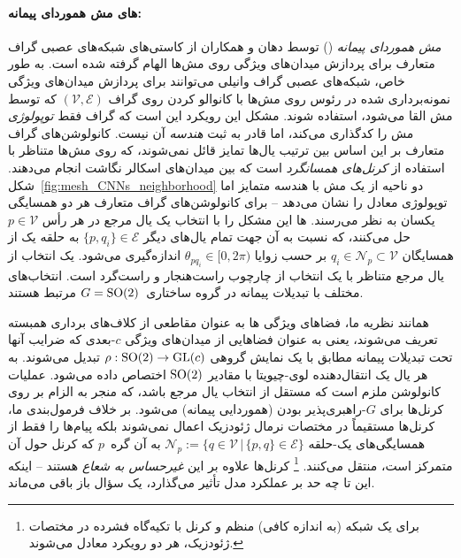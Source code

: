 \paragraph{های مش هموردای پیمانه:}
\emph{ مش هموردای پیمانه} () توسط دهان و همکاران\cite{deHaan2020meshCNNs} از کاستی‌های شبکه‌های عصبی گراف متعارف برای پردازش میدان‌های ویژگی روی مش‌ها الهام گرفته شده است.
به طور خاص، شبکه‌های عصبی گراف وانیلی می‌توانند برای پردازش میدان‌های ویژگی نمونه‌برداری شده در رئوس روی مش‌ها با کانوالو کردن روی گراف $(\mathcal{V},\mathcal{E})$ که توسط مش القا می‌شود، استفاده شوند.
مشکل این رویکرد این است که گراف فقط \emph{توپولوژی} مش را کدگذاری می‌کند، اما قادر به ثبت \emph{هندسه} آن نیست.
کانولوشن‌های گراف متعارف بر این اساس بین ترتیب یال‌ها تمایز قائل نمی‌شوند، که روی مش‌ها متناظر با استفاده از \emph{کرنل‌های همسانگرد} است که بین میدان‌های اسکالر نگاشت انجام می‌دهند.
شکل~\ref{fig:mesh_CNNs_neighborhood} دو ناحیه از یک مش با هندسه متمایز اما توپولوژی معادل را نشان می‌دهد -- برای کانولوشن‌های گراف متعارف هر دو همسایگی یکسان به نظر می‌رسند.
ها این مشکل را با انتخاب یک یال مرجع در هر رأس $p\in\mathcal{V}$ حل می‌کنند، که نسبت به آن جهت تمام یال‌های دیگر $\{p,q_i\} \in\mathcal{E}$ به حلقه یک از همسایگان $q_i\in \mathcal{N}_p \subset\mathcal{V}$ بر حسب زوایا $\theta_{pq_i} \in [0,2\pi)$ اندازه‌گیری می‌شود.
یک انتخاب از یال مرجع متناظر با یک انتخاب از چارچوب راست‌هنجار و راست‌گرد است.
انتخاب‌های مختلف با تبدیلات پیمانه در گروه ساختاری~$G=\operatorname{SO}(2)$ مرتبط هستند.

همانند نظریه ما، فضاهای ویژگی ها به عنوان مقاطعی از کلاف‌های برداری همبسته تعریف می‌شوند، یعنی به عنوان فضاهایی از میدان‌های ویژگی $c$-بعدی که ضرایب آنها تحت تبدیلات پیمانه مطابق با یک نمایش گروهی $\rho: \operatorname{SO}(2) \to \operatorname{GL}(c)$ تبدیل می‌شوند.
به هر یال یک انتقال‌دهنده لوی-چیویتا با مقادیر $\operatorname{SO}(2)$ اختصاص داده می‌شود.
عملیات کانولوشن ملزم است که مستقل از انتخاب یال مرجع باشد، که منجر به الزام بر روی کرنل‌ها برای $G$-راهبری‌پذیر بودن (هموردایی پیمانه) می‌شود.
بر خلاف فرمول‌بندی ما، کرنل‌ها مستقیماً در مختصات نرمال ژئودزیک اعمال نمی‌شوند بلکه پیام‌ها را فقط از همسایگی‌های یک-حلقه $\mathcal{N}_p := \{q\in\mathcal{V} \,|\, \{p,q\}\in\mathcal{E} \}$ به آن گره~$p$ که کرنل حول آن متمرکز است، منتقل می‌کنند.%
\footnote{
    برای یک شبکه (به اندازه کافی) منظم و کرنل با تکیه‌گاه فشرده در مختصات ژئودزیک، هر دو رویکرد معادل می‌شوند.
}
کرنل‌ها علاوه بر این \emph{غیرحساس به شعاع} هستند -- اینکه این تا چه حد بر عملکرد مدل تأثیر می‌گذارد، یک سؤال باز باقی می‌ماند.

